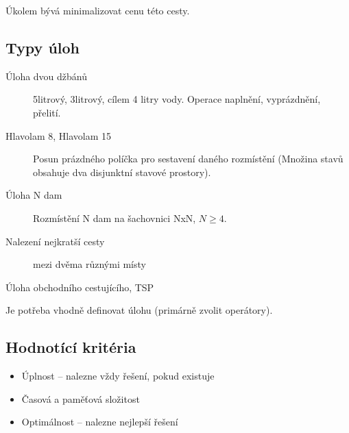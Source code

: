 \documentclass[a4paper, 11pt]{report}
\begin{document}
Úkolem bývá minimalizovat cenu této cesty.

\subsection{Typy úloh}
\begin{description}
	\item[Úloha dvou džbánů] 5litrový, 3litrový, cílem 4 litry vody. Operace naplnění, vyprázdnění, přelití.
	\item[Hlavolam 8, Hlavolam 15] Posun prázdného políčka pro sestavení daného rozmístění (Množina stavů obsahuje dva disjunktní stavové prostory).
	\item[Úloha N dam] Rozmístění N dam na šachovnici NxN, $N \geq 4$.
	\item[Nalezení nejkratší cesty] mezi dvěma různými místy
	\item[Úloha obchodního cestujícího, TSP]
\end{description}

Je potřeba vhodně definovat úlohu (primárně zvolit operátory).

\subsection{Hodnotící kritéria}
\begin{itemize}
	\item Úplnost -- nalezne vždy řešení, pokud existuje
	\item Časová a paměťová složitost
	\item Optimálnost -- nalezne nejlepší řešení
\end{itemize}
\end{document}
